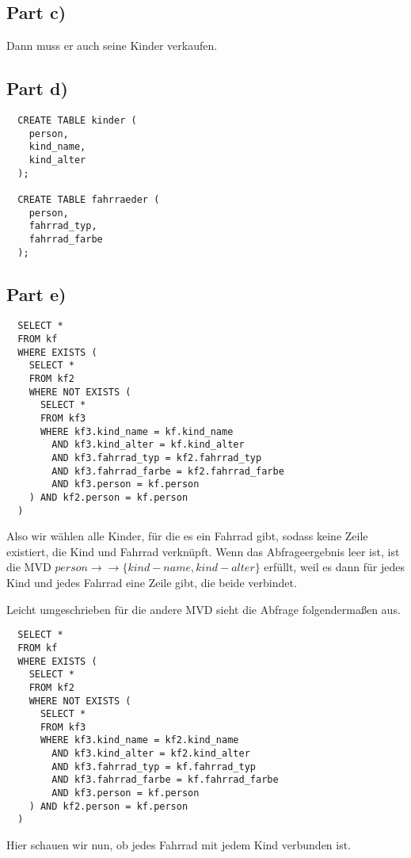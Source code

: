 \documentclass[10pt,a4paper]{article}
\begin{document}
\subsection*{Part c)}

Dann muss er auch seine Kinder verkaufen.

\subsection*{Part d)}

\begin{verbatim}
  CREATE TABLE kinder (
    person,
    kind_name,
    kind_alter
  );

  CREATE TABLE fahrraeder (
    person,
    fahrrad_typ,
    fahrrad_farbe
  );
\end{verbatim}

\subsection*{Part e)}

\begin{verbatim}
  SELECT *
  FROM kf
  WHERE EXISTS (
    SELECT *
    FROM kf2
    WHERE NOT EXISTS (
      SELECT *
      FROM kf3
      WHERE kf3.kind_name = kf.kind_name
        AND kf3.kind_alter = kf.kind_alter
        AND kf3.fahrrad_typ = kf2.fahrrad_typ
        AND kf3.fahrrad_farbe = kf2.fahrrad_farbe
        AND kf3.person = kf.person
    ) AND kf2.person = kf.person
  )
\end{verbatim}
Also wir wählen alle Kinder, für die es ein Fahrrad gibt, sodass keine Zeile existiert, die Kind und Fahrrad verknüpft.
Wenn das Abfrageergebnis leer ist, ist die MVD $person \rightarrow \rightarrow \{ kind-name, kind-alter \}$ erfüllt, weil es dann für jedes Kind und jedes Fahrrad eine Zeile gibt, die beide verbindet.

Leicht umgeschrieben für die andere MVD sieht die Abfrage folgendermaßen aus.
\begin{verbatim}
  SELECT *
  FROM kf
  WHERE EXISTS (
    SELECT *
    FROM kf2
    WHERE NOT EXISTS (
      SELECT *
      FROM kf3
      WHERE kf3.kind_name = kf2.kind_name
        AND kf3.kind_alter = kf2.kind_alter
        AND kf3.fahrrad_typ = kf.fahrrad_typ
        AND kf3.fahrrad_farbe = kf.fahrrad_farbe
        AND kf3.person = kf.person
    ) AND kf2.person = kf.person
  )
\end{verbatim}
Hier schauen wir nun, ob jedes Fahrrad mit jedem Kind verbunden ist.
\end{document}
